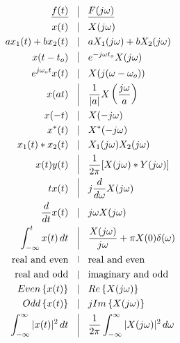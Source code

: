\begin{multicols}{2}

\begin{equation*}
  \begin{split}
    \underline{f(t)}\quad&\vline\quad\underline{F(j\omega)}\\
    x(t)\quad&\vline\quad X(j\omega)\\
    ax_1(t)+bx_2(t)\quad&\vline\quad aX_1(j\omega)+bX_2(j\omega)\\
    x(t-t_o)\quad&\vline\quad e^{-j\omega t_o}X(j\omega)\\
    e^{j\omega_ot}x(t)\quad&\vline\quad X(j(\omega-\omega_o))\\
    x(at)\quad&\vline\quad\frac{1}{|a|}X\left( \frac{j\omega}{a} \right)\\
    x(-t)\quad&\vline\quad X(-j\omega)\\
    x^*(t)\quad&\vline\quad X^*(-j\omega)\\
    x_1(t)*x_2(t)\quad&\vline\quad X_1(j\omega)X_2(j\omega)\\
    x(t)y(t)\quad&\vline\quad\frac{1}{2\pi}[X(j\omega)*Y(j\omega)]\\
    tx(t)\quad&\vline\quad j\frac{d}{d\omega}X(j\omega)\\
    \frac{d}{dt}x(t)\quad&\vline\quad j\omega X(j\omega)\\
    \int_{-\infty}^{t} x(t)\,dt\quad&\vline\quad \frac{X(j\omega)}{j\omega}+\pi X(0)\delta(\omega)\\
    \text{real and even}\quad&\vline\quad\text{real and even}\\
    \text{real and odd}\quad&\vline\quad\text{imaginary and odd}\\
    Even\left\{x(t)\right\}\quad&\vline\quad Re\left\{ X(j\omega) \right\}\\
    Odd\left\{x(t)\right\}\quad&\vline\quad j Im\left\{ X(j\omega) \right\}\\
    \int_{-\infty}^{\infty}|x(t)|^2\,dt\quad&\vline\quad \frac{1}{2\pi}\int_{-\infty}^{\infty}|X(j\omega)|^2\,d\omega\\
  \end{split}
  \label{1}
  \end{equation*}
    

\end{multicols}
